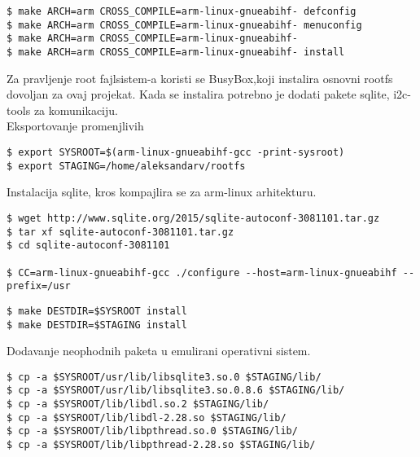 \documentclass{article}
\begin{document}

\begin{commandline}
  \begin{verbatim}
$ make ARCH=arm CROSS_COMPILE=arm-linux-gnueabihf- defconfig
$ make ARCH=arm CROSS_COMPILE=arm-linux-gnueabihf- menuconfig
$ make ARCH=arm CROSS_COMPILE=arm-linux-gnueabihf- 
$ make ARCH=arm CROSS_COMPILE=arm-linux-gnueabihf- install
  \end{verbatim}
\end{commandline}

Za pravljenje root fajlsistem-a koristi se BusyBox,koji instalira osnovni rootfs dovoljan za ovaj projekat. Kada se instalira potrebno je dodati pakete sqlite, i2c-tools za komunikaciju. \\

 
Eksportovanje promenjlivih

\begin{commandline}
  \begin{verbatim}
$ export SYSROOT=$(arm-linux-gnueabihf-gcc -print-sysroot)
$ export STAGING=/home/aleksandarv/rootfs
  \end{verbatim}
\end{commandline}


Instalacija sqlite, kros kompajlira se za arm-linux arhitekturu.

\begin{commandline}
  \begin{verbatim}
$ wget http://www.sqlite.org/2015/sqlite-autoconf-3081101.tar.gz
$ tar xf sqlite-autoconf-3081101.tar.gz
$ cd sqlite-autoconf-3081101

$ CC=arm-linux-gnueabihf-gcc ./configure --host=arm-linux-gnueabihf --prefix=/usr
  \end{verbatim}
\end{commandline}

\begin{commandline}
  \begin{verbatim}
$ make DESTDIR=$SYSROOT install
$ make DESTDIR=$STAGING install
  \end{verbatim}
\end{commandline}

Dodavanje neophodnih paketa u emulirani operativni sistem.

\begin{commandline}
  \begin{verbatim}
$ cp -a $SYSROOT/usr/lib/libsqlite3.so.0 $STAGING/lib/
$ cp -a $SYSROOT/usr/lib/libsqlite3.so.0.8.6 $STAGING/lib/
$ cp -a $SYSROOT/lib/libdl.so.2 $STAGING/lib/
$ cp -a $SYSROOT/lib/libdl-2.28.so $STAGING/lib/
$ cp -a $SYSROOT/lib/libpthread.so.0 $STAGING/lib/
$ cp -a $SYSROOT/lib/libpthread-2.28.so $STAGING/lib/
  \end{verbatim}
\end{commandline}
\end{document}
